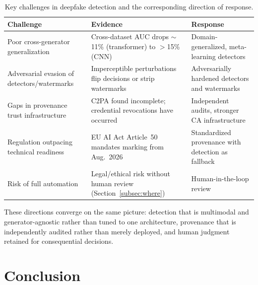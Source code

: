 \documentclass[a4paper,12pt]{article}
\begin{document}
\begin{table}[H]
    \centering
    \renewcommand{\arraystretch}{1.3}
    \begin{tabular}{@{} >{\raggedright\arraybackslash}p{4.0cm} >{\raggedright\arraybackslash}p{5.8cm} >{\raggedright\arraybackslash}p{4.8cm} @{}}
        \toprule
        \rowcolor{gray!15}
        \textbf{Challenge} & \textbf{Evidence} & \textbf{Response} \\
        \midrule
        Poor cross-generator generalization & Cross-dataset AUC drops $\sim$11\% (transformer) to $>$15\% (CNN) \cite{raza2026review} & Domain-generalized, meta-learning detectors \cite{nguyenle2026survey} \\
        \midrule
        Adversarial evasion of detectors/watermarks & Imperceptible perturbations flip decisions or strip watermarks \cite{jiang2023evading} & Adversarially hardened detectors and watermarks \\
        \midrule
        Gaps in provenance trust infrastructure & C2PA found incomplete; credential revocations have occurred \cite{golaszewski2026c2pa} & Independent audits, stronger CA infrastructure \\
        \midrule
        Regulation outpacing technical readiness & EU AI Act Article~50 mandates marking from Aug.\ 2026 \cite{euaiact2024} & Standardized provenance with detection as fallback \\
        \midrule
        Risk of full automation & Legal/ethical risk without human review (Section~\ref{subsec:where}) & Human-in-the-loop review \\
        \bottomrule
    \end{tabular}
    \caption{Key challenges in deepfake detection and the corresponding direction of response.}
    \label{tab:challenges}
\end{table}

These directions converge on the same picture: detection that is multimodal and generator-agnostic rather than tuned to one architecture, provenance that is independently audited rather than merely deployed, and human judgment retained for consequential decisions.


\section{Conclusion}
\label{sec:conclusion}
\end{document}
